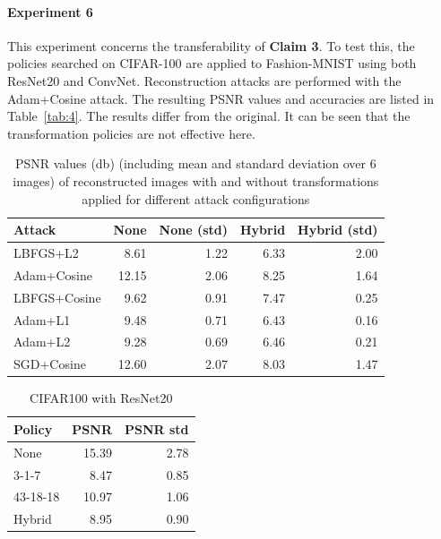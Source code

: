 \paragraph{Experiment 6} This experiment concerns the transferability of \textbf{Claim 3}. To test this, the policies searched on CIFAR-100 are applied to Fashion-MNIST using both ResNet20 and ConvNet. Reconstruction attacks are performed with the Adam+Cosine attack. The resulting PSNR values and accuracies are listed in Table~\ref{tab:4}. The results differ from the original. It can be seen that the transformation policies are not effective here.

\begin{table}[htb!]
    \centering
    \begin{tabular}{lrrrr}
        \hline
         Attack       &   None &   None  (std) &   Hybrid &   Hybrid  (std) \\
        \hline
         LBFGS+L2     &               8.61 &             1.22 &                 6.33 &                2.00 \\
         Adam+Cosine  &              12.15 &             2.06 &                 8.25 &                1.64 \\
         LBFGS+Cosine &               9.62 &             0.91 &                 7.47 &                0.25 \\
         Adam+L1      &               9.48 &             0.71 &                 6.43 &                0.16 \\
         Adam+L2      &               9.28 &             0.69 &                 6.46 &                0.21 \\
         SGD+Cosine   &              12.60 &             2.07 &                 8.03 &                1.47 \\
        \hline
        \end{tabular}
    \caption{PSNR values (db) (including mean and standard deviation over $6$ images) of reconstructed images with and without transformations applied for different attack configurations}
    \label{tab:2}
\end{table}
\begin{table}[htb!]
    \centering
        \begin{tabular}{lrr}
            \hline
             Policy   &   PSNR &   PSNR std \\
            \hline
             None     &       15.39 &       2.78 \\
             3-1-7    &        8.47 &       0.85 \\
             43-18-18 &       10.97 &       1.06 \\
             Hybrid   &        8.95 &       0.90 \\
            \hline
        \end{tabular}
    \caption{CIFAR100 with ResNet20}
    \label{tab:my_label}
\end{table}




